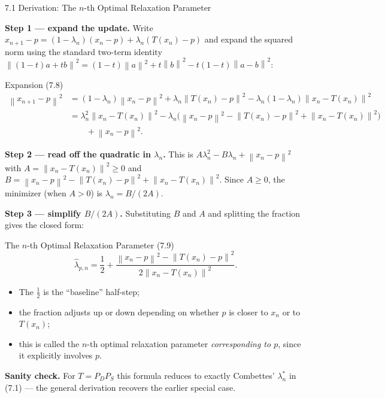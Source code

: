 \documentclass[aspectratio=169,10pt]{beamer}
\newcommand{\norm}[1]{\left\|#1\right\|}
\begin{document}
\begin{frame}{7.1 Derivation: The $n$-th Optimal Relaxation Parameter}

  \textbf{Step 1 --- expand the update.} Write
  $x_{n+1}-p=(1-\lambda_n)(x_n-p)+\lambda_n(T(x_n)-p)$ and expand
  the squared norm using the standard two-term identity
  $\norm{(1-t)a+tb}^2=(1-t)\norm{a}^2+t\norm{b}^2-t(1-t)\norm{a-b}^2$:
  \begin{block}{Expansion (7.8)}
    \begin{align*}
      \norm{x_{n+1}-p}^2
      &= (1-\lambda_n)\norm{x_n-p}^2+\lambda_n\norm{T(x_n)-p}^2
         -\lambda_n(1-\lambda_n)\norm{x_n-T(x_n)}^2\\
      &= \lambda_n^2\norm{x_n-T(x_n)}^2
         -\lambda_n\bigl(\norm{x_n-p}^2-\norm{T(x_n)-p}^2+\norm{x_n-T(x_n)}^2\bigr)\\
      &\qquad+\norm{x_n-p}^2.
    \end{align*}
  \end{block}

  \textbf{Step 2 --- read off the quadratic in $\lambda_n$.} This is
  $A\lambda_n^2 - B\lambda_n + \norm{x_n-p}^2$ with
  $A=\norm{x_n-T(x_n)}^2\ge0$ and $B=\norm{x_n-p}^2-\norm{T(x_n)-p}^2+\norm{x_n-T(x_n)}^2$.
  Since $A\ge0$, the minimizer (when $A>0$) is $\lambda_n=B/(2A)$.

  \framebreak

  \textbf{Step 3 --- simplify $B/(2A)$.} Substituting $B$ and $A$
  and splitting the fraction gives the closed form:
  \begin{block}{The $n$-th Optimal Relaxation Parameter (7.9)}
    \[
      \widehat\lambda_{p,n} = \frac{1}{2}
        + \frac{\norm{x_n-p}^2-\norm{T(x_n)-p}^2}{2\norm{x_n-T(x_n)}^2}.
    \]
    \begin{itemize}
      \item The $\tfrac12$ is the ``baseline'' half-step;
      \item the fraction adjusts up or down depending on whether
            $p$ is closer to $x_n$ or to $T(x_n)$;
      \item this is called the $n$-th optimal relaxation parameter
            \emph{corresponding to $p$}, since it explicitly involves
            $p$.
    \end{itemize}
  \end{block}

  \textbf{Sanity check.} For $T=P_DP_S$ this formula reduces to
  exactly Combettes' $\lambda_n^*$ in (7.1) --- the general
  derivation recovers the earlier special case.

\end{frame}
\end{document}
